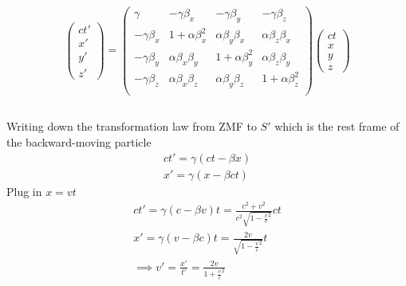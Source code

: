 \documentclass[12pt]{article}
\begin{document}
        \begin{equation*}
            \begin{pmatrix}
                ct'\\
                x'\\
                y'\\
                z'
            \end{pmatrix} = \begin{pmatrix}
                \gamma & -\gamma\beta_x&-\gamma\beta_y&-\gamma\beta_z\\
                -\gamma\beta_x&1 + \alpha \beta_x^2&\alpha \beta_y\beta_x&\alpha\beta_z\beta_x\\
                -\gamma\beta_y& \alpha \beta_x\beta_y&1 +\alpha \beta_y^2&\alpha\beta_z\beta_y\\
                -\gamma\beta_z&\alpha \beta_x\beta_z&\alpha \beta_y\beta_z&1 +\alpha\beta_z^2\\
            \end{pmatrix}\begin{pmatrix}
                ct\\
                x\\
                y\\
                z
            \end{pmatrix}
        \end{equation*}
        \subsection{} Writing down the transformation law from ZMF to $S'$ which is the rest frame of the backward-moving particle
        \begin{gather*}
            ct' = \gamma(ct -\beta x)\\
            x' = \gamma(x -\beta ct)
        \end{gather*}
        Plug in \(x = vt\)
        \begin{gather*}
            ct' = \gamma(c -\beta v)t = \frac{c^2 + v^2}{c^2\sqrt{1 - \frac{v}{c}^2}} ct\\
            x' = \gamma(v -\beta c)t = \frac{2v}{\sqrt{1 - \frac{v}{c}^2}} t\\
            \implies v' =\frac{x'}{t'} = \frac{2v}{1 + \frac{v}{c}^2}
        \end{gather*}
        \subsection{}
\end{document}
